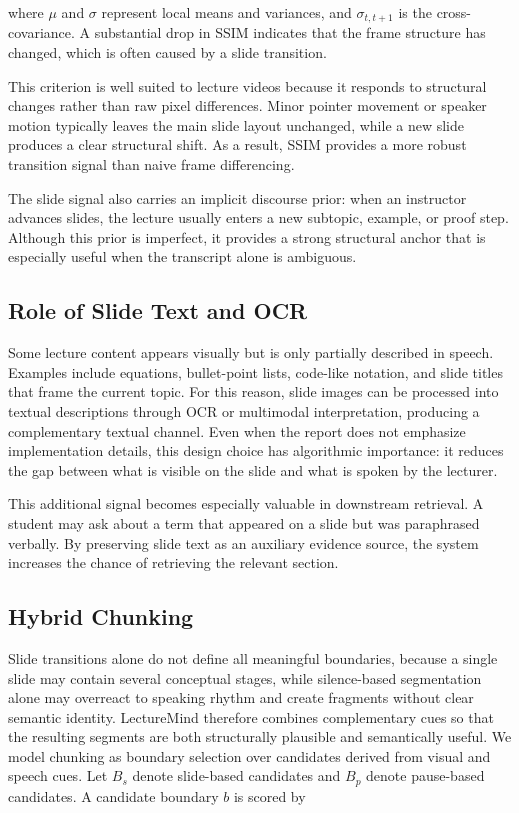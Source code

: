 where $\mu$ and $\sigma$ represent local means and variances, and $\sigma_{t,t+1}$ is the cross-covariance. A substantial drop in SSIM indicates that the frame structure has changed, which is often caused by a slide transition.

This criterion is well suited to lecture videos because it responds to structural changes rather than raw pixel differences. Minor pointer movement or speaker motion typically leaves the main slide layout unchanged, while a new slide produces a clear structural shift. As a result, SSIM provides a more robust transition signal than naive frame differencing.

The slide signal also carries an implicit discourse prior: when an instructor advances slides, the lecture usually enters a new subtopic, example, or proof step. Although this prior is imperfect, it provides a strong structural anchor that is especially useful when the transcript alone is ambiguous.

\subsection{Role of Slide Text and OCR}

Some lecture content appears visually but is only partially described in speech. Examples include equations, bullet-point lists, code-like notation, and slide titles that frame the current topic. For this reason, slide images can be processed into textual descriptions through OCR or multimodal interpretation, producing a complementary textual channel. Even when the report does not emphasize implementation details, this design choice has algorithmic importance: it reduces the gap between what is visible on the slide and what is spoken by the lecturer.

This additional signal becomes especially valuable in downstream retrieval. A student may ask about a term that appeared on a slide but was paraphrased verbally. By preserving slide text as an auxiliary evidence source, the system increases the chance of retrieving the relevant section.

\subsection{Hybrid Chunking}

Slide transitions alone do not define all meaningful boundaries, because a single slide may contain several conceptual stages, while silence-based segmentation alone may overreact to speaking rhythm and create fragments without clear semantic identity. LectureMind therefore combines complementary cues so that the resulting segments are both structurally plausible and semantically useful. We model chunking as boundary selection over candidates derived from visual and speech cues. Let $B_s$ denote slide-based candidates and $B_p$ denote pause-based candidates. A candidate boundary $b$ is scored by

